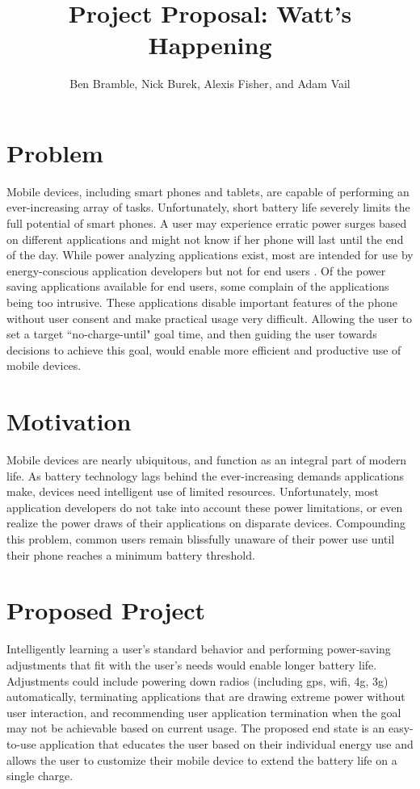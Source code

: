 \documentclass{article}
\title{Project Proposal: Watt's Happening}
\author{Ben Bramble, Nick Burek, Alexis Fisher, and Adam Vail}
\begin{document}
\maketitle

\section*{Problem}
Mobile devices, including smart phones and tablets, are capable of performing an ever-increasing array of tasks. 
Unfortunately, short battery life severely limits the full potential of smart phones. 
A user may experience erratic power surges based on different applications and might not know if her phone will last until the end of the day. 
While power analyzing applications exist, most are intended for use by energy-conscious application developers but not for end users \cite{eprof} \cite{energy-aware}. 
Of the power saving applications available for end users, some complain of the applications being too intrusive. 
These applications disable important features of the phone without user consent and make practical usage very difficult. 
Allowing the user to set a target ``no-charge-until" goal time, and then guiding the user towards decisions to achieve this goal, would enable more efficient and productive use of mobile devices.

\section*{Motivation}
Mobile devices are nearly ubiquitous, and function as an integral part of modern life. 
As battery technology lags behind the ever-increasing demands applications make, devices need intelligent use of limited resources. 
Unfortunately, most application developers do not take into account these power limitations, or even realize the power draws of their applications on disparate devices. 
Compounding this problem, common users remain blissfully unaware of their power use until their phone reaches a minimum battery threshold.

\section*{Proposed Project}
Intelligently learning a user's standard behavior and performing power-saving adjustments that fit with the user's needs would enable longer battery life. 
Adjustments could include powering down radios (including gps, wifi, 4g, 3g) automatically, terminating applications that are drawing extreme power without user interaction, 
and recommending user application termination when the goal may not be achievable based on current usage. 
The proposed end state is an easy-to-use application that educates the user based on their individual energy use and allows the user to customize their mobile device to extend the battery life on a single charge.
\end{document}
